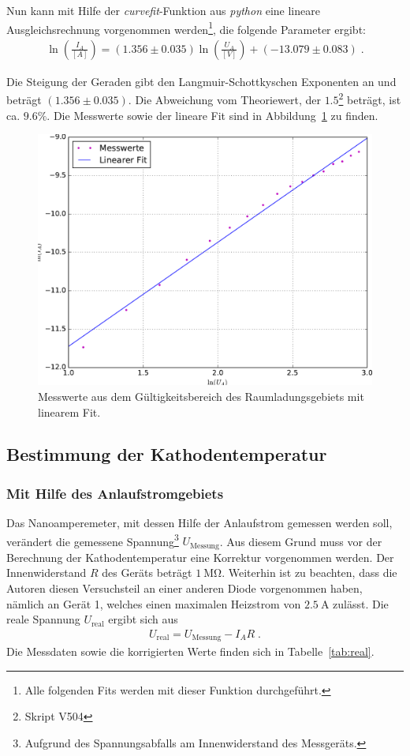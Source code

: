Nun kann mit Hilfe der \emph{curvefit}-Funktion aus \emph{python} eine lineare Ausgleichsrechnung vorgenommen werden\footnote{Alle folgenden Fits werden mit dieser Funktion durchgeführt.}, die folgende Parameter ergibt:
\begin{align}
  \ln{(\frac{I_A}{[A]})} = (1.356 \pm 0.035) \ln{(\frac{U_A}{[V]})} + (-13.079 \pm 0.083) \; .
\end{align}

Die Steigung der Geraden gibt den Langmuir-Schottkyschen Exponenten an und beträgt $(1.356 \pm 0.035)$. Die Abweichung vom Theoriewert, der $1.5$\footnote{Skript V504} beträgt, ist ca. $9.6\%$. Die Messwerte sowie der lineare Fit sind in Abbildung~\ref{fig:langmuh} zu finden.

\begin{figure}[H]
  \centering
  \includegraphics[width=0.6\textheight]{../plots/langmuh.pdf}
  \caption{Messwerte aus dem Gültigkeitsbereich des Raumladungsgebiets mit linearem Fit. }
\label{fig:langmuh}
\end{figure}

\subsection{Bestimmung der Kathodentemperatur}
\subsubsection{Mit Hilfe des Anlaufstromgebiets}
Das Nanoamperemeter, mit dessen Hilfe der Anlaufstrom gemessen werden soll, verändert die gemessene Spannung\footnote{Aufgrund des Spannungsabfalls am Innenwiderstand des Messgeräts.} $U_{\mathrm{Messung}}$. Aus diesem Grund muss vor der Berechnung der Kathodentemperatur eine Korrektur vorgenommen werden. Der Innenwiderstand $R$ des Geräts beträgt $\SI{1}{\mega\ohm}$. Weiterhin ist zu beachten, dass die Autoren diesen Versuchsteil an einer anderen Diode vorgenommen haben, nämlich an Gerät 1, welches einen maximalen Heizstrom von $\SI{2.5}{\ampere}$ zulässt. Die reale Spannung $U_{\mathrm{real}}$ ergibt sich aus
\begin{align}
  U_{\mathrm{real}} = U_{\mathrm{Messung}} - I_A R \; .
\end{align}
Die Messdaten sowie die korrigierten Werte finden sich in Tabelle~\ref{tab:real}.


